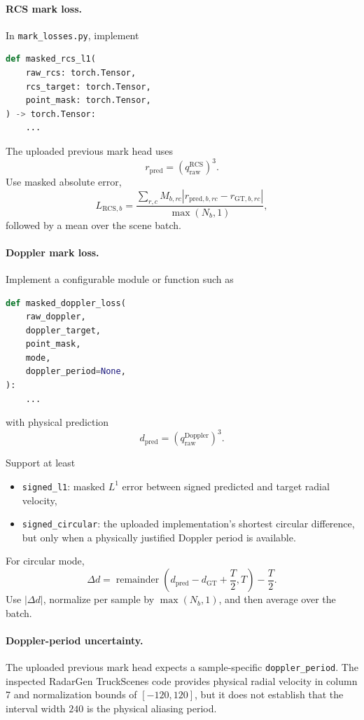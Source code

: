 \documentclass[11pt,a4paper]{article}
\begin{document}
\paragraph{RCS mark loss.}
In \texttt{mark\_losses.py}, implement
\begin{lstlisting}[language=Python]
def masked_rcs_l1(
    raw_rcs: torch.Tensor,
    rcs_target: torch.Tensor,
    point_mask: torch.Tensor,
) -> torch.Tensor:
    ...
\end{lstlisting}

The uploaded previous mark head uses
\[
    r_{\mathrm{pred}}
    =
    \left(q_{\mathrm{raw}}^{\mathrm{RCS}}\right)^3.
\]
Use masked absolute error,
\[
    L_{\mathrm{RCS},b}
    =
    \frac{
        \sum_{r,c}
        M_{b,rc}
        \left|
            r_{\mathrm{pred},b,rc}
            -
            r_{\mathrm{GT},b,rc}
        \right|
    }{
        \max(N_b,1)
    },
\]
followed by a mean over the scene batch.

\paragraph{Doppler mark loss.}
Implement a configurable module or function such as
\begin{lstlisting}[language=Python]
def masked_doppler_loss(
    raw_doppler,
    doppler_target,
    point_mask,
    mode,
    doppler_period=None,
):
    ...
\end{lstlisting}
with physical prediction
\[
    d_{\mathrm{pred}}
    =
    \left(q_{\mathrm{raw}}^{\mathrm{Doppler}}\right)^3.
\]

Support at least
\begin{itemize}
    \item \texttt{signed\_l1}: masked \(L^1\) error between signed predicted and target radial velocity,
    \item \texttt{signed\_circular}: the uploaded implementation's shortest circular difference, but only when a physically justified Doppler period is available.
\end{itemize}

For circular mode,
\[
    \Delta d
    =
    \operatorname{remainder}
    \left(
        d_{\mathrm{pred}}-d_{\mathrm{GT}}+\frac{T}{2},
        T
    \right)
    -
    \frac{T}{2}.
\]
Use \(|\Delta d|\), normalize per sample by \(\max(N_b,1)\), and then average over the batch.

\paragraph{Doppler-period uncertainty.}
The uploaded previous mark head expects a sample-specific \texttt{doppler\_period}. The inspected RadarGen TruckScenes code provides physical radial velocity in column 7 and normalization bounds of \([-120,120]\), but it does not establish that the interval width \(240\) is the physical aliasing period.
\end{document}
